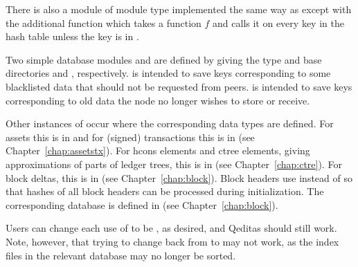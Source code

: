 There is also a module {} of module type {}
implemented the same way as {} except with the additional function {}
which takes a function $f$ and calls it on every key in the hash table {}
unless the key is in {}.

Two simple database modules {} and {}
are defined by giving {} the type {} and 
base directories {} and {}, respectively.
{} is intended to save keys corresponding to some blacklisted data that
should not be requested from peers.
{} is intended to save keys corresponding to old data the node no longer wishes
to store or receive.

Other instances of {}
occur where the corresponding data types are defined.
For assets this is in {}
and
for (signed) transactions this is in {}
(see Chapter~\ref{chap:assetstx}).
For hcons elements and ctree elements,
giving approximations of parts of ledger trees,
this is in {}
(see Chapter~\ref{chap:ctre}).
For block deltas,
this is in {}
(see Chapter~\ref{chap:block}).
Block headers use {} instead of {}
so that hashes of all block headers can be processed during initialization.
The corresponding database {}
is defined in {}
(see Chapter~\ref{chap:block}).

Users can change each use of {} to be {},
as desired, and Qeditas should still work. Note, however, that
trying to change back from {} to {}
may not work, as the index files in the relevant database may no longer be sorted.
